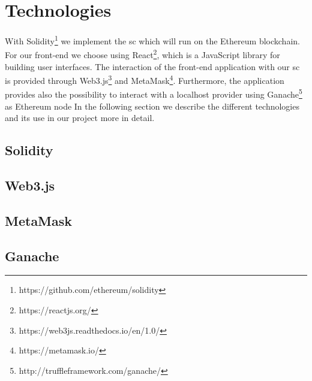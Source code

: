 \chapter{Technologies}\label{ch:technologies}
With Solidity\footnote{https://github.com/ethereum/solidity} we implement the \ac{sc} which will run on the Ethereum blockchain. For our front-end we choose using React\footnote{https://reactjs.org/}, which is a JavaScript library for building user interfaces. The interaction of the front-end application with our \ac{sc} is provided through Web3.js\footnote{https://web3js.readthedocs.io/en/1.0/} and MetaMask\footnote{https://metamask.io/}. Furthermore, the application provides also the possibility to interact with a localhost provider using Ganache\footnote{http://truffleframework.com/ganache/} as Ethereum node
In the following section we describe the different technologies and its use in our project more in detail.
\section{Solidity}
\section{Web3.js}
\section{MetaMask}
\section{Ganache}
